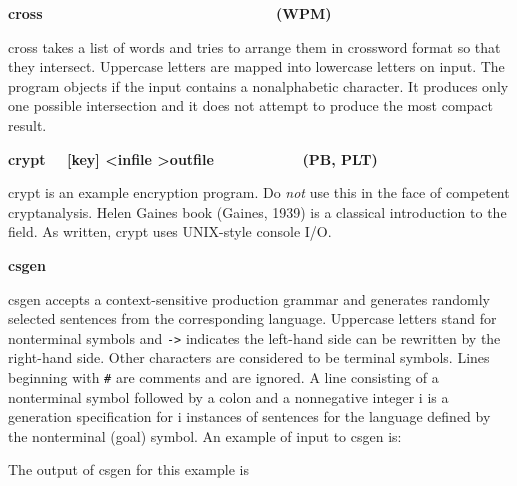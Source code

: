 {{\sffamily\bfseries
cross\ \ \ \ \ \ \ \ \ \ \ \ \ \ \ \ \ \ \ \  \ \ \ \ \ \ \ \ \ (WPM)}

\textsf{cross} takes a list of words and tries to arrange them in
crossword format so that they intersect. Uppercase letters are mapped
into lowercase letters on input. The program objects if the input
contains a nonalphabetic character. It produces only one possible
intersection and it does not attempt to produce the most compact
result. 

{\sffamily\bfseries
crypt \ \ \textrm{\textmd{[key] {\textless}infile
{\textgreater}outfile\ \ \ \ \ \ \ \ \ \  \ }}(PB, PLT)}

\textsf{crypt} is an example encryption program. Do
\textit{not} use this in the face of competent cryptanalysis. Helen
Gaines{\textquotesingle} book (Gaines, 1939) is a classical
introduction to the field. As written, \textsf{crypt} uses UNIX-style
console I/O.

{\sffamily\bfseries
csgen\ \ \ \ \ \ \ \ \ \ \ \ \ \ \ \ \ \ \ \ \ \ }

\textsf{csgen} accepts a context-sensitive production grammar and
generates randomly selected sentences from the corresponding language.
Uppercase letters stand for nonterminal symbols and
\texttt{{}-{\textgreater}} indicates the left-hand side can be
rewritten by the right-hand side. Other characters are considered to be
terminal symbols. Lines beginning with \texttt{\#} are comments and are
ignored. A line consisting of a nonterminal symbol followed by a colon
and a nonnegative integer i is a generation specification for i
instances of sentences for the language defined by the nonterminal
(goal) symbol. An example of input to \textsf{csgen} is:


The output of \textsf{csgen} for this example is

}
